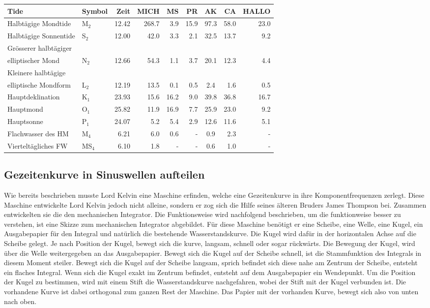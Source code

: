 \begin{tabular}{|l|l|r|r|r|r|c|r|r|}
	\hline
	Tide&Symbol&Zeit&MICH&MS&PR&AK&CA&HALLO\\
	\hline \hline
	Halbtägige Mondtide&M$_{2}$&12.42&268.7&3.9&15.9&97.3&58.0&23.0\\
	\hline
	Halbtägige Sonnentide&S$_{2}$&12.00&42.0&3.3&2.1&32.5&13.7&9.2\\
	\hline
	Grösserer halbtägiger&&&&&&&&\\
	elliptischer Mond&N$_{2}$&12.66&54.3&1.1&3.7&20.1&12.3&4.4\\
	\hline
	Kleinere halbtägige&&&&&&&&\\
	elliptische Mondform&L$_{2}$&12.19&13.5&0.1&0.5&2.4&1.6&0.5\\
	\hline\hline 
	Hauptdeklination&K$_{1}$&23.93&15.6&16.2&9.0&39.8&36.8&16.7\\
	\hline
	Hauptmond&O$_{1}$&25.82&11.9&16.9&7.7&25.9&23.0&9.2\\
	\hline
	Hauptsonne&P$_{1}$&24.07&5.2&5.4&2.9&12.6&11.6&5.1\\
	\hline\hline
	Flachwasser des HM&M$_{4}$&6.21&6.0&0.6&-&0.9&2.3&-\\
	\hline
	Vierteltägliches FW&MS$_{4}$&6.10&1.8&-&-&0.6&1.0&-\\
	\hline	
\end{tabular}
\label{Tabelle Partialtide}

\subsection{Gezeitenkurve in Sinuswellen aufteilen
	\label{gezeiten:subsection:malorum}}
Wie bereits beschrieben musste Lord Kelvin eine Maschine erfinden, welche eine Gezeitenkurve in ihre Komponentfrequenzen zerlegt.
Diese Maschine entwickelte Lord Kelvin jedoch nicht alleine, sondern er zog sich die Hilfe seines älteren Bruders James Thompson bei.
Zusammen entwickelten sie die den mechanischen Integrator.
Die Funktionsweise wird nachfolgend beschrieben, um die funktionweise besser zu verstehen, ist eine Skizze zum mechanischen Integrator abgebildet.
Für diese Maschine benötigt er eine Scheibe, eine Welle, eine Kugel, ein Ausgabepapier für den Integral und natürlich die bestehende Wasserstandskurve.
Die Kugel wird dafür in der horizontalen Achse auf die Scheibe gelegt.
Je nach Position der Kugel, bewegt sich die kurve, langsam, schnell oder sogar rückwärts.
Die Bewegung der Kugel, wird über die Welle weitergegeben an das Ausgabepapier.
Bewegt sich die Kugel auf der Scheibe schnell, ist die Stammfunktion des Integrals in diesem Moment steiler.
Bewegt sich die Kugel auf der Scheibe langsam, sprich befindet sich diese nahe am Zentrum der Scheibe, entsteht ein flaches Integral.
Wenn sich die Kugel exakt im Zentrum befindet, entsteht auf dem Ausgabepapier ein Wendepunkt.
Um die Position der Kugel zu bestimmen, wird mit einem Stift die Wasserstandskurve nachgefahren, wobei der Stift mit der Kugel verbunden ist.
Die vorhandene Kurve ist dabei orthogonal zum ganzen Rest der Maschine.
Das Papier mit der vorhanden Kurve, bewegt sich also von unten nach oben.

